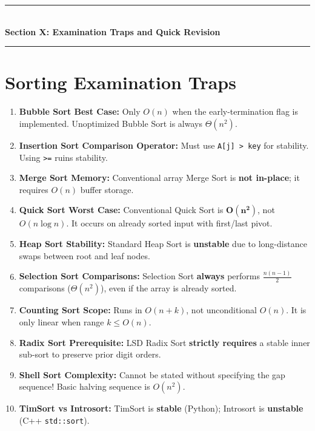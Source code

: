 \newpage
\begin{center}
\vspace{0.5em}
{\color{primary}\rule{0.45\textwidth}{1.2pt}}\\[4pt]
{\Large\bfseries\color{primary} Section X: Examination Traps and Quick Revision}\\[2pt]
{\color{primary}\rule{0.45\textwidth}{1.2pt}}
\vspace{0.5em}
\end{center}

\section{Sorting Examination Traps}

\begin{enumerate}
    \item \textbf{Bubble Sort Best Case:} Only $O(n)$ when the early-termination flag is implemented. Unoptimized Bubble Sort is always $\Theta(n^2)$.
    \item \textbf{Insertion Sort Comparison Operator:} Must use \texttt{A[j] > key} for stability. Using \texttt{>=} ruins stability.
    \item \textbf{Merge Sort Memory:} Conventional array Merge Sort is \textbf{not in-place}; it requires $O(n)$ buffer storage.
    \item \textbf{Quick Sort Worst Case:} Conventional Quick Sort is $\mathbf{O(n^2)}$, not $O(n \log n)$. It occurs on already sorted input with first/last pivot.
    \item \textbf{Heap Sort Stability:} Standard Heap Sort is \textbf{unstable} due to long-distance swaps between root and leaf nodes.
    \item \textbf{Selection Sort Comparisons:} Selection Sort \textbf{always} performs $\frac{n(n-1)}{2}$ comparisons ($\Theta(n^2)$), even if the array is already sorted.
    \item \textbf{Counting Sort Scope:} Runs in $O(n + k)$, not unconditional $O(n)$. It is only linear when range $k \leq O(n)$.
    \item \textbf{Radix Sort Prerequisite:} LSD Radix Sort \textbf{strictly requires} a stable inner sub-sort to preserve prior digit orders.
    \item \textbf{Shell Sort Complexity:} Cannot be stated without specifying the gap sequence! Basic halving sequence is $O(n^2)$.
    \item \textbf{TimSort vs Introsort:} TimSort is \textbf{stable} (Python); Introsort is \textbf{unstable} (C++ \texttt{std::sort}).
\end{enumerate}

